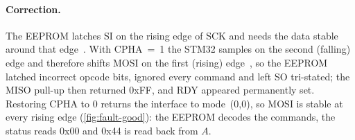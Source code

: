\paragraph{Correction.}
The EEPROM latches SI on the rising edge of SCK and needs the data stable
around that edge~\cite[p.~5, Tab.~7]{eeprom}. With CPHA~=~1 the STM32 samples
on the second (falling) edge and therefore shifts MOSI on the first (rising)
edge~\cite[\S28.5.6]{rm0091}, so the EEPROM latched incorrect opcode bits, ignored every
command and left SO tri-stated; the MISO pull-up then returned 0xFF, and RDY
appeared permanently set. Restoring CPHA to 0 returns
the interface to mode~(0,0), so MOSI is stable at every rising edge
(\cref{fig:fault-good}): the EEPROM decodes the commands, the status reads
0x00 and 0x44 is read back from $A$.
